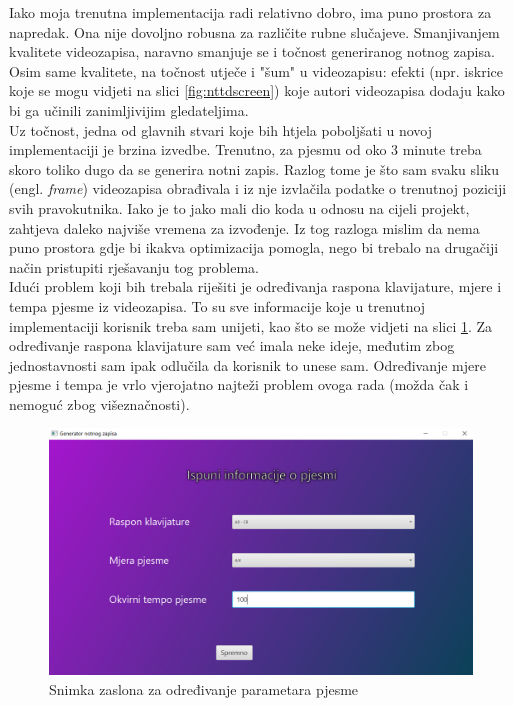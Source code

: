 \documentclass[times, utf8, seminar, numeric]{fer}
\begin{document}
Iako moja trenutna implementacija radi relativno dobro, ima puno prostora za napredak. Ona nije dovoljno robusna za različite rubne slučajeve. Smanjivanjem kvalitete videozapisa, naravno smanjuje se i točnost generiranog notnog zapisa. Osim same kvalitete, na točnost utječe i "šum" u videozapisu: efekti (npr. iskrice koje se mogu vidjeti na slici \ref{fig:nttdscreen}) koje autori videozapisa dodaju kako bi ga učinili zanimljivijim gledateljima.\\

Uz točnost, jedna od glavnih stvari koje bih htjela poboljšati u novoj implementaciji je brzina izvedbe. Trenutno, za pjesmu od oko 3 minute treba skoro toliko dugo da se generira notni zapis. Razlog tome je što sam svaku sliku (engl. \textit{frame}) videozapisa obrađivala i iz nje izvlačila podatke o trenutnoj poziciji svih pravokutnika. Iako je to jako mali dio koda u odnosu na cijeli projekt, zahtjeva daleko najviše vremena za izvođenje. Iz tog razloga mislim da nema puno prostora gdje bi ikakva optimizacija pomogla, nego bi trebalo na drugačiji način pristupiti rješavanju tog problema.\\

Idući problem koji bih trebala riješiti je određivanja raspona klavijature, mjere i tempa pjesme iz videozapisa. To su sve informacije koje u trenutnoj implementaciji korisnik treba sam unijeti, kao što se može vidjeti na slici \ref{fig:screen2}. Za određivanje raspona klavijature sam već imala neke ideje, međutim zbog jednostavnosti sam ipak odlučila da korisnik to unese sam. Određivanje mjere pjesme i tempa je vrlo vjerojatno najteži problem ovoga rada (možda čak i nemoguć zbog višeznačnosti).

\begin{figure}[h]
	\includegraphics[scale=0.43]{screen2.png}
	\centering
	\caption{Snimka zaslona za određivanje parametara pjesme}
	\label{fig:screen2}
\end{figure}
\end{document}
